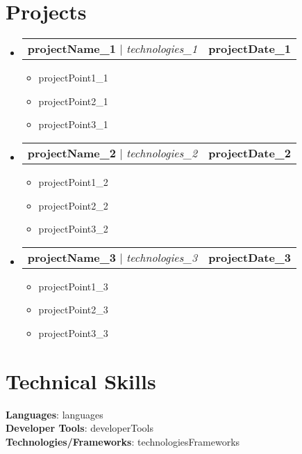 \documentclass[letterpaper,11pt]{article}
\makeatletter
\newcommand{\resumeItem}[1]{
  \item\small{
    {#1 \vspace{-2pt}}
  }
}
\newcommand{\resumeProjectHeading}[2]{
    \item
    \begin{tabular*}{1.001\textwidth}{l@{\extracolsep{\fill}}r}
      \small#1 & \textbf{\small #2}\\
    \end{tabular*}\vspace{-7pt}
}
\newcommand{\resumeSubHeadingListStart}{\begin{itemize}[leftmargin=0.0in, label={}]}
\newcommand{\resumeSubHeadingListEnd}{\end{itemize}}
\newcommand{\resumeItemListStart}{\begin{itemize}}
\newcommand{\resumeItemListEnd}{\end{itemize}\vspace{-5pt}}
\makeatother
\begin{document}
\section{Projects}
    \vspace{-5pt}
    \resumeSubHeadingListStart
    
      \resumeProjectHeading
          {\textbf{ {{projectName_1}} } $|$ \emph{ {{technologies_1}} }}{ {{projectDate_1}} }
          \resumeItemListStart
            \resumeItem{ {{projectPoint1_1}} }
            \resumeItem{ {{projectPoint2_1}} }
            \resumeItem{ {{projectPoint3_1}} }
          \resumeItemListEnd
          \vspace{-13pt}

      \resumeProjectHeading
          {\textbf{ {{projectName_2}} } $|$ \emph{ {{technologies_2}} }}{ {{projectDate_2}} }
          \resumeItemListStart
            \resumeItem{ {{projectPoint1_2}} }
            \resumeItem{ {{projectPoint2_2}} }
            \resumeItem{ {{projectPoint3_2}} }
          \resumeItemListEnd
          \vspace{-13pt}

      \resumeProjectHeading
          {\textbf{ {{projectName_3}} } $|$ \emph{ {{technologies_3}} }}{ {{projectDate_3}} }
          \resumeItemListStart
            \resumeItem{ {{projectPoint1_3}} }
            \resumeItem{ {{projectPoint2_3}} }
            \resumeItem{ {{projectPoint3_3}} }
          \resumeItemListEnd
    \resumeSubHeadingListEnd
\vspace{-15pt}

%
\section{Technical Skills}
 \begin{itemize}[leftmargin=0.15in, label={}]
    \small{\item{
     \textbf{Languages}{: {{languages}}} \\
     \textbf{Developer Tools}{: {{developerTools}}} \\
     \textbf{Technologies/Frameworks}{: {{technologiesFrameworks}}} \\
    }}
 \end{itemize}
 \vspace{-16pt}
\end{document}
